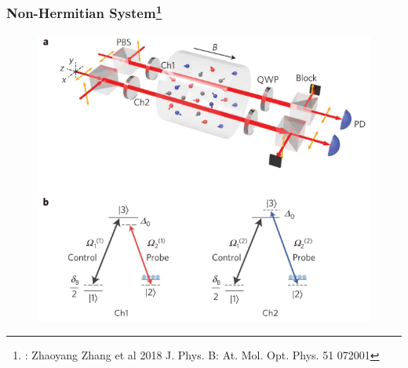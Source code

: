 \documentclass{beamer}
\begin{document}
\begin{frame}
\frametitle{Non-Hermitian System\footnote{: Zhaoyang Zhang et al 2018 J. Phys. B: At. Mol. Opt. Phys. 51 072001}}

\begin{figure}
\includegraphics[scale=0.6]{figure/e2.png}
\end{figure}
\end{frame}
\end{document}
